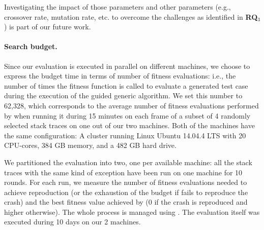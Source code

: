 Investigating the impact of those parameters and other parameters (e.g., cross\-over rate, mutation rate, etc. to overcome the challenges as identified in \textbf{RQ$_3$}) is part of our future work. 

\paragraph{Search budget.}

Since our evaluation is executed in parallel on different machines, we choose to express the budget time in terms of number of fitness evaluations: i.e., the number of times the fitness function is called to evaluate a generated test case during the execution of the guided generic algorithm. We set this number to 62,328, which corresponds to the average number of fitness evaluations performed by \evocrash when running it during 15 minutes on each frame of a subset of 4 randomly selected stack traces on one out of our two machines. Both of the machines have the same configuration: A cluster running Linux Ubuntu 14.04.4 LTS with 20 CPU-cores, 384 GB memory, and a 482 GB hard drive.

We partitioned the evaluation into two, one per available machine: all the stack traces with the same kind of exception have been run on one machine for 10 rounds.
%
For each run, we measure the number of fitness evaluations needed to achieve reproduction (or the exhaustion of the budget if \evocrash fails to reproduce the crash) and the best fitness value achieved by \evocrash (0 if the crash is reproduced and higher otherwise).
%
The whole process is managed using \exrunner.
The evaluation itself was executed during 10 days on our 2 machines.